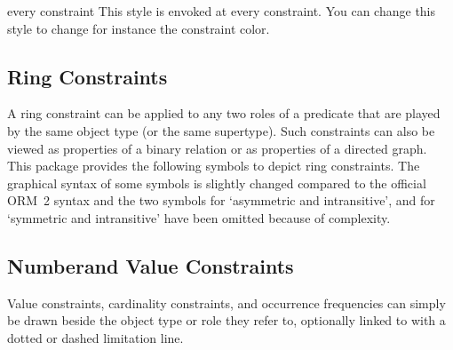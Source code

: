 \documentclass[a4paper,10pt]{article}
\begin{document}
\begin{stylekey}{every constraint}
  This style is envoked at every constraint. You can change this style to change for instance the constraint color.
\end{stylekey}


\subsection{Ring Constraints}
\label{sec:ringconstraints}

A ring constraint can be applied to any two roles of a predicate that are played by the same object type (or the same supertype). Such constraints can also be viewed as properties of a binary relation or as properties of a directed graph. This package provides the following symbols to depict ring constraints. The graphical syntax of some symbols is slightly changed compared to the official ORM~2 syntax and the two symbols for `asymmetric and intransitive', and for `symmetric and intransitive' have been omitted because of complexity.

\begin{codeexample}[]
\centering
{}
\end{codeexample}

\begin{codeexample}[width=2.5cm]
\end{codeexample}


\subsection{Numberand Value Constraints}
Value constraints, cardinality constraints, and occurrence frequencies can simply be drawn beside the object type or role they refer to, optionally linked to with a dotted or dashed limitation line.
\end{document}
